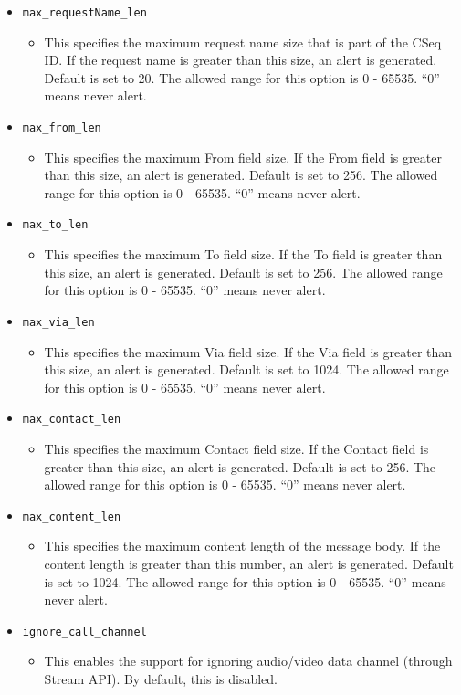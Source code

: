 \documentclass[english]{report}
\begin{document}
\begin{itemize}
\item[] \texttt{max\_requestName\_len}
\begin{itemize}
  \item[]  This specifies the maximum request name size that is part of the CSeq ID. 
      If the request name is greater than this size, an alert is generated. 
      Default is set to 20. The allowed range for this option is 0 - 65535. 
     ``0'' means never alert.
\end{itemize}

\item[] \texttt{max\_from\_len}
\begin{itemize}
  \item[]  This specifies the maximum From field size. If the From field is greater 
      than this size, an alert is generated. Default is set to 256. The allowed
      range for this option is 0 - 65535. ``0'' means never alert.
\end{itemize}

\item[] \texttt{max\_to\_len}
\begin{itemize}
  \item[]   This specifies the maximum To field size. If the To field is greater than
      this size, an alert is generated. Default is set to 256. The allowed range 
      for this option is 0 - 65535. ``0'' means never alert.
\end{itemize}

\item[] \texttt{max\_via\_len}
\begin{itemize}
  \item[]  This specifies the maximum Via field size. If the Via field is greater than 
      this size, an alert is generated. Default is set to 1024. The allowed range 
      for this option is 0 - 65535. ``0'' means never alert.
\end{itemize}
\item[] \texttt{max\_contact\_len}
\begin{itemize}
  \item[]   This specifies the maximum Contact field size. If the Contact field is 
      greater than this size, an alert is generated. Default is set to 256. 
      The allowed range for this option is 0 - 65535. ``0''  means never alert.
\end{itemize}
\item[] \texttt{max\_content\_len}
\begin{itemize}
  \item[]   This specifies the maximum content length of the message body. If the 
      content length is greater than this number, an alert is generated. 
      Default is set to 1024. The allowed range for this option is 0 - 65535. 
      ``0'' means never alert.
\end{itemize}
\item[] \texttt{ignore\_call\_channel}
\begin{itemize}
  \item[]   This enables the support for ignoring audio/video data channel 
      (through Stream API). By default, this is disabled.
\end{itemize}


\end{itemize}
\end{document}
